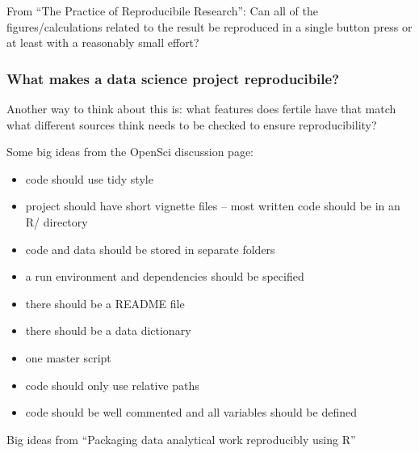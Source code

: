 \documentclass[12pt]{article}
\providecommand{\tightlist}{%
  \setlength{\itemsep}{0pt}\setlength{\parskip}{0pt}}
\begin{document}
\citet{goodman2016does}

From ``The Practice of Reproducibile Research'': Can all of the
figures/calculations related to the result be reproduced in a single
button press or at least with a reasonably small effort?

\citet{kitzes2017practice}

\subsubsection{What makes a data science project
reproducibile?}\label{what-makes-a-data-science-project-reproducibile}

Another way to think about this is: what features does fertile have that
match what different sources think needs to be checked to ensure
reproducibility?

Some big ideas from the OpenSci discussion page:

\begin{itemize}
\tightlist
\item
  code should use tidy style
\item
  project should have short vignette files -- most written code should
  be in an R/ directory
\item
  code and data should be stored in separate folders
\item
  a run environment and dependencies should be specified
\item
  there should be a README file
\item
  there should be a data dictionary
\item
  one master script
\item
  code should only use relative paths
\item
  code should be well commented and all variables should be defined
\end{itemize}

Big ideas from ``Packaging data analytical work reproducibly using R''
\end{document}

